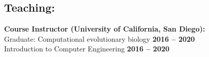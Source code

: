 \documentclass[margin,line,letterpaper]{resume}
\begin{document}
\begin{resume}


    \section{\mysidestyle Teaching:}

    \textbf{Course Instructor (University of California, San Diego):}\vspace{2mm}\\\vspace{1mm}%
     Graduate: Computational evolutionary biology  \hfill \textbf{2016 -- 2020}\\
     Introduction to Computer Engineering  \hfill \textbf{2016 -- 2020}


\end{resume}
\end{document}
